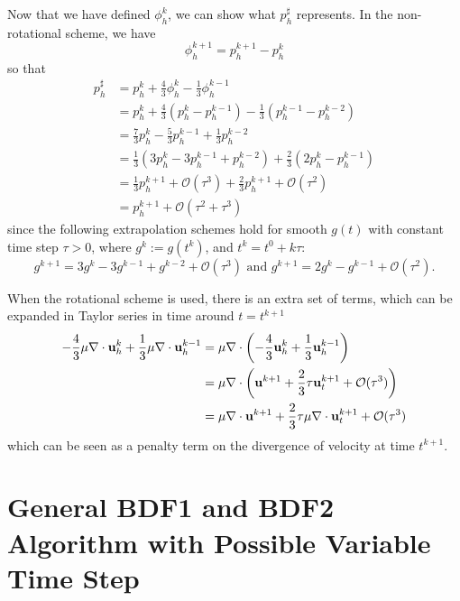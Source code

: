 \documentclass[letterpaper]{erdc}
\begin{document}
\begin{remark}
Now that we have defined $\phi_h^{k}$, we can show what $p_h^{\sharp}$ represents.  In the non-rotational scheme, we have
\begin{equation}
  \phi_h^{k+1} = p_h^{k+1} - p_h^{k}
\end{equation}
so that
  \begin{align}
    p_h^{\sharp} &= p_h^{k} + \frac{4}{3}\phi_h^{k} - \frac{1}{3}\phi_h^{k-1}\\
    &= p_h^{k} + \frac{4}{3}\left(p_h^{k} - p_h^{k-1}\right) - \frac{1}{3}\left(p_h^{k-1} - p_h^{k-2}\right)\\
    &= \frac{7}{3}p_h^{k} - \frac{5}{3}p_h^{k-1}+ \frac{1}{3}p_h^{k-2} \\
    &= \frac{1}{3}\left( 3p_h^{k} - 3p_h^{k-1} + p_h^{k-2} \right) + \frac{2}{3}\left(2p_h^{k} - p_h^{k-1}  \right)\\
    &= \frac{1}{3}p_h^{k+1} + \mathcal{O}(\tau^{3}) + \frac{2}{3} p_h^{k+1} + \mathcal{O}(\tau^{2})\\
    &= p_h^{k+1} + \mathcal{O}\left(\tau^2+\tau^3\right)
  \end{align}
  since the following extrapolation schemes hold for smooth $g(t)$ with constant time step $\tau>0$, where $g^{k} := g\left(t^{k}\right)$, and $t^k = t^0+k\tau$:
  \begin{equation}
    g^{k+1} = 3g^k - 3g^{k-1}+g^{k-2} + \mathcal{O}(\tau^3) \mbox{ and } g^{k+1}=2g^{k} - g^{k-1}+\mathcal{O}(\tau^2).
  \end{equation}
  
  When the rotational scheme is used, there is an extra set of terms, which can be expanded in Taylor series in time around $t=t^{k+1}$
  \begin{align}
    -\frac{4}{3}\mu\nabla\cdot\textbf{u}_h^{k} + \frac{1}{3}\mu\nabla\cdot\textbf{u}_h^{k-1} &= \mu\nabla\cdot\left( -\frac{4}{3}\textbf{u}_h^{k} + \frac{1}{3}\textbf{u}_h^{k-1} \right)\\
    &= \mu\nabla\cdot\left( \textbf{u}^{k+1} + \frac{2}{3}\tau\textbf{u}_t^{k+1} + \mathcal{O}(\tau^{3}) \right)\\
    &= \mu\nabla\cdot\textbf{u}^{k+1} + \frac{2}{3}\tau\mu\nabla\cdot\textbf{u}_t^{k+1} + \mathcal{O}(\tau^{3})
  \end{align}
  which can be seen as a penalty term on the divergence of velocity at time $t^{k+1}$.  

\end{remark}


%
%
%
\section{General BDF1 and BDF2 Algorithm with Possible Variable Time Step}\label{sec:GeneralAlgorithm}
\end{document}
